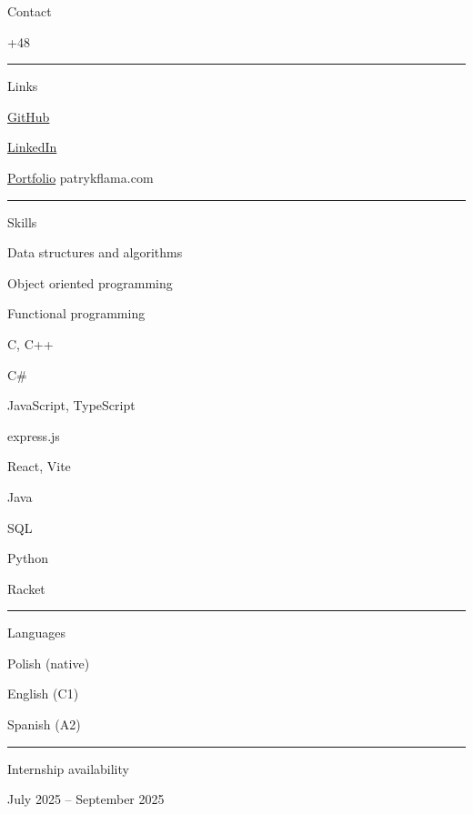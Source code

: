 \documentclass{letter}
\begin{document}
\begin{minipage}[t]{0.30\textwidth}
\setlength{\baselineskip}{1.5\baselineskip}
\begin{tcolorbox}[colback=darkblue!90!black, colframe=darkblue!90!black, sharp corners, height=\textheight]

\color{white}
\vspace{2cm}

{\large Contact}

\faPhone \quad +48 \ContactPhone

\faEnvelope \quad \href{mailto:\ContactEmail}{\ContactEmail}

\rule{\linewidth}{0.4pt}

{\large Links}

\faGithub \quad \href{https://github.com/\GitHubID}{GitHub\space\space} 
{\color{gray}\GitHubID}

\faLinkedin \quad \href{https://www.linkedin.com/in/\LinkedInID}{LinkedIn}
{\color{gray}\LinkedInID}

\faArrowCircleRight \quad \href{https://www.patrykflama.com}{Portfolio}
{\color{gray}patrykflama.com}

\rule{\linewidth}{0.4pt}

{\large Skills}

\faCircleNotch \quad Data structures and algorithms

\faCircleNotch \quad Object oriented programming

\faCircleNotch \quad Functional programming

\faCircleNotch \quad C, C++

\faCircleNotch \quad C\#

\faCircleNotch \quad JavaScript, TypeScript

\faCircleNotch \quad express.js

\faCircleNotch \quad React, Vite

\faCircleNotch \quad Java

\faCircleNotch \quad SQL

\faCircleNotch \quad Python

\faCircleNotch \quad Racket


\rule{\linewidth}{0.4pt}

{\large Languages}

\faLanguage \quad Polish {\color{gray}(native)}

\faLanguage \quad English {\color{gray}(C1)}

\faLanguage \quad Spanish {\color{gray}(A2)}


\rule{\linewidth}{0.4pt}

{\large Internship availability}

\faClock \quad July 2025 -- September 2025

\end{tcolorbox}
\end{minipage}
\end{document}

